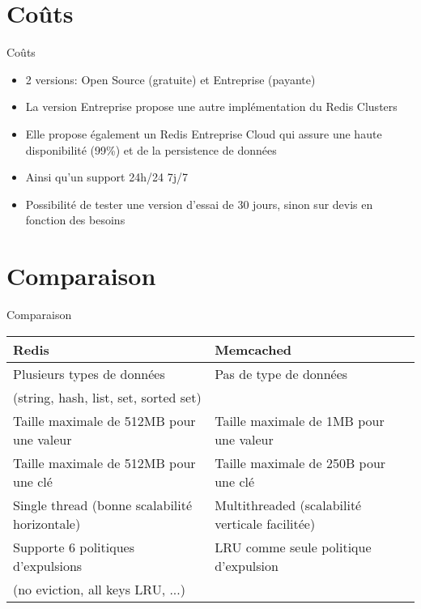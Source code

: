 \documentclass[aspectratio=169]{beamer}
\begin{document}
\section{Coûts}
\begin{frame}{Coûts}
\begin{center}

\begin{itemize}
    \item 2 versions: Open Source (gratuite) et Entreprise (payante)
    \item La version Entreprise propose une autre implémentation du Redis Clusters
    \item Elle propose également un Redis Entreprise Cloud qui assure une haute disponibilité (99\%) et de la persistence de données
    \item Ainsi qu'un support 24h/24 7j/7
    \item Possibilité de tester une version d'essai de 30 jours, sinon sur devis en fonction des besoins
\end{itemize}
\end{center}
\end{frame}

\section{Comparaison}
\begin{frame}{Comparaison}
 \begin{center}\small
  \begin{tabular}{|l|l|}
     \hline
      \textbf{Redis} & \textbf{Memcached} \\
     \hline
     \hline
        Plusieurs types de données & Pas de type de données  \\
        (string, hash, list, set, sorted set) & \\
     \hline
     Taille maximale de 512MB pour une valeur & Taille maximale de 1MB pour une valeur \\
     \hline
     Taille maximale de 512MB pour une clé  & Taille maximale de 250B pour une clé \\ 
     \hline
     Single thread (bonne scalabilité horizontale) & Multithreaded (scalabilité verticale facilitée) \\
     \hline
    Supporte 6 politiques d'expulsions & LRU comme seule politique d'expulsion  \\
     (no eviction, all keys LRU, ...) & \\
     \hline
     \end{tabular}
 \end{center}
\end{frame}
\end{document}
